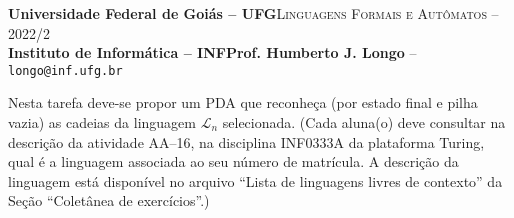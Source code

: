 \documentclass[12pt]{article}
\def\ua{16}
\begin{document}
 \begin{tcolorbox}[rounded corners, colback=blue!3, colframe=blue!40!black]
  \footnotesize\textbf{Universidade Federal de Goiás -- UFG}\hfill \textsc{Linguagens Formais e Autômatos -- 2022/2}\\
  \footnotesize\textbf{Instituto de Informática -- INF\hfill Prof. Humberto J. Longo} -- \scriptsize\texttt{longo@inf.ufg.br}
 \end{tcolorbox}\bigskip
%
\begin{tcolorbox}[rounded corners, colback=blue!2, colframe=blue!40!black, title=\textbf{Atividade AA-\ua}]
 Nesta tarefa deve-se propor um PDA que reconheça (por estado final e pilha vazia) as cadeias da linguagem $\mathcal{L}_n$ selecionada. (Cada aluna(o) deve consultar na descrição da atividade AA--\ua, na disciplina INF0333A da plataforma Turing, qual é a linguagem associada ao seu número de matrícula. A descrição da linguagem está disponível no arquivo ``Lista de linguagens livres de contexto'' da Seção ``Coletânea de exercícios''.)
\end{tcolorbox}\bigskip
\end{document}
